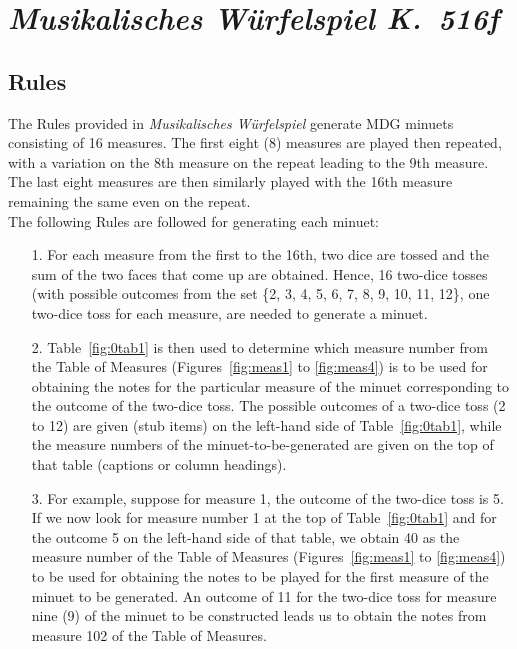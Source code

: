 \documentclass[letterpaper,x11names,svgnames,10pt]{article}
\begin{document}
{\section{\em Musikalisches W\"{u}rfelspiel K.\ 516f}

\subsection{Rules}

The Rules provided in {\em Musikalisches W\"{u}rfelspiel} generate MDG minuets consisting of 16 measures.  The first eight (8) measures are played then repeated, with a variation on the 8th measure on the repeat leading to the 9th measure.  The last eight measures are then similarly played with the 16th measure remaining the same even on the repeat. \\

The following Rules are followed for generating each minuet:
\begin{enumerate}
	\item [1.] For each measure from the first to the 16th, two dice are tossed and the sum of the two faces that come up are obtained.  Hence, 16 two-dice tosses (with possible outcomes from the set \{2, 3, 4, 5, 6, 7, 8, 9, 10, 11, 12\}, one two-dice toss for each measure, are needed to generate a minuet.   
	\item [2.] Table~\ref{fig:0tab1} is then used to determine which measure number from the Table of Measures (Figures~\ref{fig:meas1} to \ref{fig:meas4}) is to be used for obtaining the notes for the particular measure of the minuet corresponding to the outcome of the two-dice toss.  The possible outcomes of a two-dice toss (2 to 12) are given (stub items) on the left-hand side of Table~\ref{fig:0tab1}, while the measure numbers of the minuet-to-be-generated are given on the top of that table (captions or column  headings).
	\item [3.]  For example, suppose for measure 1, the outcome of the two-dice toss is 5.  If we now look for measure number 1 at the top of Table~\ref{fig:0tab1} and for the outcome 5 on the left-hand side of that table, we obtain 40 as the measure number of the Table of Measures (Figures~\ref{fig:meas1} to \ref{fig:meas4}) to be used for obtaining the notes to be played for the first measure of the minuet to be generated.  An outcome of 11 for the two-dice toss for measure nine (9) of the minuet to be constructed leads us to obtain the notes from measure 102 of the Table of Measures.
\end{enumerate}   


}
\end{document}
